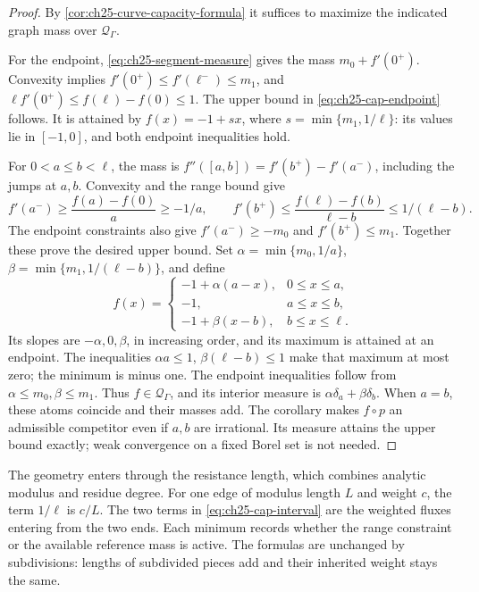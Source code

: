 \begin{proof}
By \cref{cor:ch25-curve-capacity-formula} it suffices to maximize
the indicated graph mass over \(\mathcal Q_\Gamma\).

For the endpoint, \eqref{eq:ch25-segment-measure} gives the mass
\(m_0+f'(0^+)\).  Convexity implies
\(f'(0^+)\leq f'(\ell^-)\leq m_1\), and
\(\ell f'(0^+)\leq f(\ell)-f(0)\leq1\).
The upper bound in \eqref{eq:ch25-cap-endpoint} follows.
It is attained by \(f(x)=-1+sx\), where
\(s=\min\{m_1,1/\ell\}\): its values lie in \([-1,0]\), and both
endpoint inequalities hold.

For \(0<a\leq b<\ell\), the mass is
\(f''([a,b])=f'(b^+)-f'(a^-)\), including the jumps at \(a,b\).
Convexity and the range bound give
\[
 f'(a^-)\geq\frac{f(a)-f(0)}a\geq-1/a,\qquad
 f'(b^+)\leq\frac{f(\ell)-f(b)}{\ell-b}\leq1/(\ell-b).
\]
The endpoint constraints also give
\(f'(a^-)\geq-m_0\) and \(f'(b^+)\leq m_1\).
Together these prove the desired upper bound.
Set \(\alpha=\min\{m_0,1/a\}\),
\(\beta=\min\{m_1,1/(\ell-b)\}\), and define
\[
 f(x)=
 \begin{cases}
  -1+\alpha(a-x),&0\leq x\leq a,\\
  -1,&a\leq x\leq b,\\
  -1+\beta(x-b),&b\leq x\leq\ell.
 \end{cases}
\]
Its slopes are \(-\alpha,0,\beta\), in increasing order, and its
maximum is attained at an endpoint.  The inequalities
\(\alpha a\leq1\), \(\beta(\ell-b)\leq1\) make that maximum at most
zero; the minimum is minus one.  The endpoint inequalities follow
from \(\alpha\leq m_0,\beta\leq m_1\).
Thus \(f\in\mathcal Q_\Gamma\), and its interior measure is
\(\alpha\delta_a+\beta\delta_b\).
When \(a=b\), these atoms coincide and their masses add.
The corollary makes \(f\circ p\) an admissible competitor even if
\(a,b\) are irrational.  Its measure attains the upper bound
exactly; weak convergence on a fixed Borel set is not needed.
\end{proof}

\begin{remark}
\label{rem:ch25-segment-reading}
The geometry enters through the resistance length, which combines
analytic modulus and residue degree.  For one edge of modulus
length \(L\) and weight \(c\), the term \(1/\ell\) is \(c/L\).
The two terms in \eqref{eq:ch25-cap-interval} are the weighted
fluxes entering from the two ends.  Each minimum records whether
the range constraint or the available reference mass is active.
The formulas are unchanged by subdivisions: lengths of subdivided
pieces add and their inherited weight stays the same.
\end{remark}

